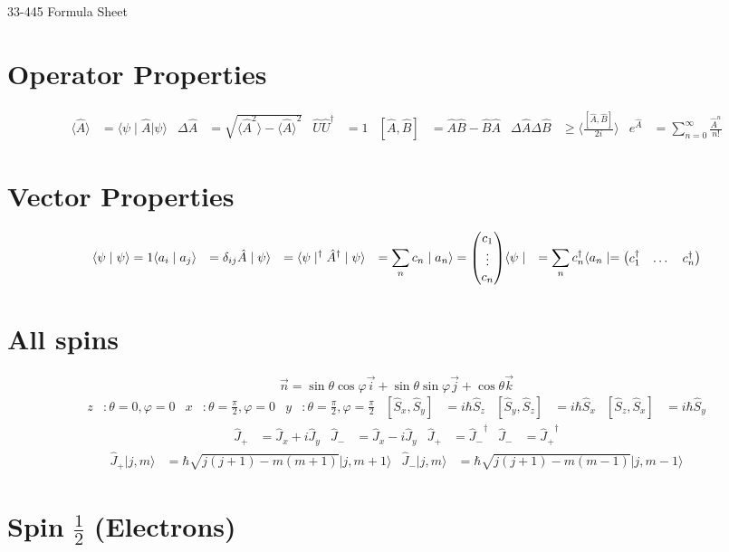\documentclass{article}
\newcommand{\mysection}[1]{\vspace{-2em}
\section*{#1}
\vspace{-2em}}
\newcommand{\bra}[1]{\ensuremath{\langle#1\mid}}
\newcommand{\ket}[1]{\ensuremath{\mid#1\rangle}}
\newcommand{\braket}[2]{\ensuremath{\langle#1\mid#2\rangle}}
\newcommand{\expect}[1]{\ensuremath{\langle#1\rangle}}
\newcommand{\op}[1]{\ensuremath{\hat#1}}
\newcommand{\opt}[1]{\tp{\op{#1}}}
\newcommand{\tp}[1]{\ensuremath{#1^\dagger}}
\newcommand{\mat}[1]{\begin{pmatrix}\ensuremath{#1}\end{pmatrix}}
\begin{document}
	\begin{center}
		{\LARGE{33-445 Formula Sheet}}
	\end{center}
	\mysection{Operator Properties}
	\begin{align*}
		\expect{\op{A}}&=\bra{\psi}\op{A}\ket{\psi} &
		\Delta\op{A}&=\sqrt{\expect{\op{A}^2}-\expect{\op{A}}^2} &
		\op{U}\opt{U}&=1 & 
		[\op{A},\op{B}]&=\op{A}\op{B}-\op{B}\op{A} &
		\Delta\op{A}\Delta\op{B}&\ge\expect{\frac{[\op{A},\op{B}]}{2i}} &
		e^{\op{A}}&=\sum\limits_{n=0}^\infty\frac{\op{A}^n}{n!}
	\end{align*}
	\mysection{Vector Properties}
	\begin{align*}
		\braket{\psi}{\psi}=1 &
		\braket{a_i}{a_j}&=\delta_{ij} &
		\op{A}\ket{\psi}&=\tp{\bra{\psi}}\opt{A} &
		\ket{\psi}&=\sum\limits_nc_n\ket{a_n}=\mat{c_1\\\vdots\\c_n} &
		\bra{\psi}&=\sum\limits_n\tp{c_n}\bra{a_n}=\mat{\tp{c_1}&\dots&\tp{c_n}}
	\end{align*}
	\mysection{All spins}
	\[\vec{n}=\sin\theta\cos\varphi\vec{i}+\sin\theta\sin\varphi\vec{j}+
		\cos\theta\vec{k}\]
	\begin{align*}
		z&:\theta=0,\varphi=0 & 
		x&:\theta=\frac{\pi}{2},\varphi=0 &
		y&:\theta=\frac{\pi}{2},\varphi=\frac{\pi}{2} &
		[\op{S_x},\op{S_y}]&=i\hbar\op{S_z} &
		[\op{S_y},\op{S_z}]&=i\hbar\op{S_x} &
		[\op{S_z},\op{S_x}]&=i\hbar\op{S_y}
	\end{align*}
	\vspace{-2em}
	\begin{align*}
		\op{J_+}&=\op{J_x}+i\op{J_y} &
		\op{J_-}&=\op{J_x}-i\op{J_y} &
		\op{J_+}&=\opt{J_-} &
		\op{J_-}&=\opt{J_+}
	\end{align*}
	\vspace{-2em}
	\begin{align*}
		\op{J_+}\ket{j,m}&=\hbar\sqrt{j(j+1)-m(m+1)}\ket{j,m+1} &
		\op{J_-}\ket{j,m}&=\hbar\sqrt{j(j+1)-m(m-1)}\ket{j,m-1}
	\end{align*}
	\mysection{Spin $\frac{1}{2}$ (Electrons)}
\end{document}
